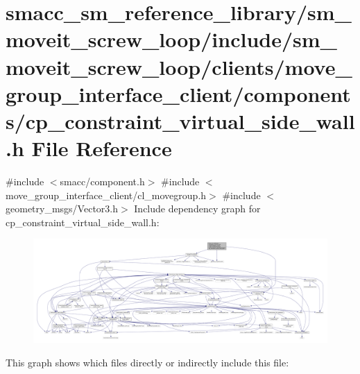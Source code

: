 \hypertarget{sm__moveit__screw__loop_2include_2sm__moveit__screw__loop_2clients_2move__group__interface__clie78a05b8c13c9563cb2f5b80fa12ea9d9}{}\section{smacc\+\_\+sm\+\_\+reference\+\_\+library/sm\+\_\+moveit\+\_\+screw\+\_\+loop/include/sm\+\_\+moveit\+\_\+screw\+\_\+loop/clients/move\+\_\+group\+\_\+interface\+\_\+client/components/cp\+\_\+constraint\+\_\+virtual\+\_\+side\+\_\+wall.h File Reference}
\label{sm__moveit__screw__loop_2include_2sm__moveit__screw__loop_2clients_2move__group__interface__clie78a05b8c13c9563cb2f5b80fa12ea9d9}
{\ttfamily \#include $<$smacc/component.\+h$>$}\newline
{\ttfamily \#include $<$move\+\_\+group\+\_\+interface\+\_\+client/cl\+\_\+movegroup.\+h$>$}\newline
{\ttfamily \#include $<$geometry\+\_\+msgs/\+Vector3.\+h$>$}\newline
Include dependency graph for cp\+\_\+constraint\+\_\+virtual\+\_\+side\+\_\+wall.\+h\+:
\nopagebreak
\begin{figure}[H]
\begin{center}
\leavevmode
\includegraphics[width=350pt]{sm__moveit__screw__loop_2include_2sm__moveit__screw__loop_2clients_2move__group__interface__cliea3f0294b08d8b893932f035158479a81}
\end{center}
\end{figure}
This graph shows which files directly or indirectly include this file\+:
\nopagebreak
